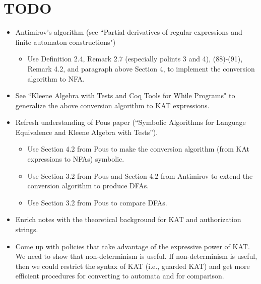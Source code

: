 \documentclass[10pt]{article}
\begin{document}
\section*{TODO}
\begin{itemize}
\item Antimirov's algorithm (see ``Partial derivatives of regular expressions and finite automaton constructions") 
\begin{itemize}
\item Use Definition 2.4, Remark 2.7 (especially polints 3 and 4), (88)-(91), Remark 4.2, and paragraph above Section 4,  to implement the conversion algorithm to NFA.
\end{itemize}
\item See ``Kleene Algebra with Tests and Coq Tools for While Programs" to generalize the above conversion algorithm to KAT expressions.
\item Refresh understanding of Pous paper (``Symbolic Algorithms for Language Equivalence and Kleene Algebra with Tests'').
\begin{itemize}
\item Use Section 4.2 from Pous to make the conversion algorithm (from KAt expressions to NFAs) symbolic.
\item Use Section 3.2 from Pous and Section 4.2 from Antimirov to extend the conversion algorithm to produce DFAs.
\item Use Section 3.2 from Pous to compare DFAs.
\end{itemize}  
\item Enrich notes with the theoretical background for KAT and authorization strings.
\item Come up with policies that take advantage of the expressive power of KAT. We need to show that non-determinism is useful. If non-determinism is useful, then we could restrict the syntax of KAT (i.e., guarded KAT) and get more efficient procedures for converting to automata and for comparison.
\end{itemize}
\end{document}
